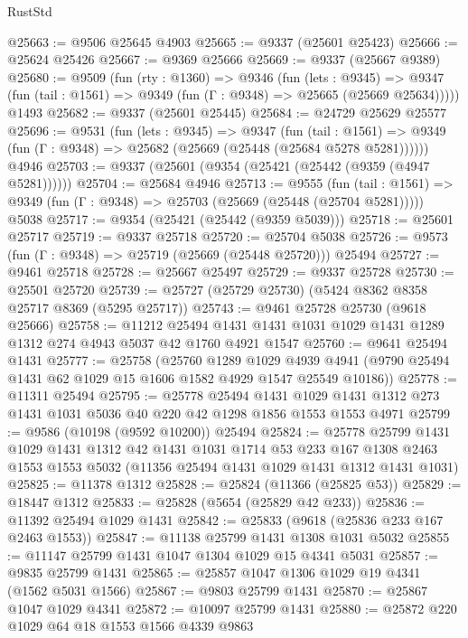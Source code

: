 \begin{lexlean}{RustStd}
\begin{coremodule}
@25663 := @9506 @25645 @4903
@25665 := @9337 (@25601 @25423)
@25666 := @25624 @25426
@25667 := @9369 @25666
@25669 := @9337 (@25667 @9389)
@25680 := @9509
    (fun (rty : @1360) =>
    @9346
      (fun (lets : @9345) =>
      @9347 (fun (tail : @1561) => @9349 (fun (Γ : @9348) => @25665 (@25669 @25634)))))
    @1493
@25682 := @9337 (@25601 @25445)
@25684 := @24729 @25629 @25577
@25696 := @9531
    (fun (lets : @9345) =>
    @9347
      (fun (tail : @1561) =>
      @9349 (fun (Γ : @9348) => @25682 (@25669 (@25448 (@25684 @5278 @5281))))))
    @4946
@25703 := @9337 (@25601 (@9354 (@25421 (@25442 (@9359 (@4947 @5281))))))
@25704 := @25684 @4946
@25713 := @9555
    (fun (tail : @1561) => @9349 (fun (Γ : @9348) => @25703 (@25669 (@25448 (@25704 @5281)))))
    @5038
@25717 := @9354 (@25421 (@25442 (@9359 @5039)))
@25718 := @25601 @25717
@25719 := @9337 @25718
@25720 := @25704 @5038
@25726 := @9573 (fun (Γ : @9348) => @25719 (@25669 (@25448 @25720))) @25494
@25727 := @9461 @25718
@25728 := @25667 @25497
@25729 := @9337 @25728
@25730 := @25501 @25720
@25739 := @25727 (@25729 @25730) (@5424 @8362 @8358 @25717 @8369 (@5295 @25717))
@25743 := @9461 @25728 @25730 (@9618 @25666)
@25758 := @11212
    @25494
    @1431
    @1431
    @1031
    @1029
    @1431
    @1289
    @1312
    @274
    @4943
    @5037
    @42
    @1760
    @4921
    @1547
@25760 := @9641 @25494 @1431
@25777 := @25758
    (@25760
      @1289
      @1029
      @4939
      @4941
      (@9790 @25494 @1431 @62 @1029 @15 @1606 @1582 @4929 @1547 @25549 @10186))
@25778 := @11311 @25494
@25795 := @25778
    @25494
    @1431
    @1029
    @1431
    @1312
    @273
    @1431
    @1031
    @5036
    @40
    @220
    @42
    @1298
    @1856
    @1553
    @1553
    @4971
@25799 := @9586 (@10198 (@9592 @10200)) @25494
@25824 := @25778
    @25799
    @1431
    @1029
    @1431
    @1312
    @42
    @1431
    @1031
    @1714
    @53
    @233
    @167
    @1308
    @2463
    @1553
    @1553
    @5032
    (@11356 @25494 @1431 @1029 @1431 @1312 @1431 @1031)
@25825 := @11378 @1312
@25828 := @25824 (@11366 (@25825 @53))
@25829 := @18447 @1312
@25833 := @25828 (@5654 (@25829 @42 @233))
@25836 := @11392 @25494 @1029 @1431
@25842 := @25833 (@9618 (@25836 @233 @167 @2463 @1553))
@25847 := @11138 @25799 @1431 @1308 @1031 @5032
@25855 := @11147 @25799 @1431 @1047 @1304 @1029 @15 @4341 @5031
@25857 := @9835 @25799 @1431
@25865 := @25857 @1047 @1306 @1029 @19 @4341 (@1562 @5031 @1566)
@25867 := @9803 @25799 @1431
@25870 := @25867 @1047 @1029 @4341
@25872 := @10097 @25799 @1431
@25880 := @25872 @220 @1029 @64 @18 @1553 @1566 @4339 @9863

\end{coremodule}
\end{lexlean}
